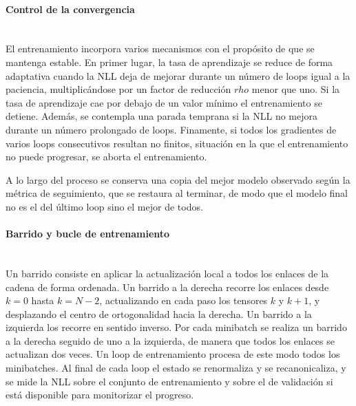 \documentclass[12pt]{extarticle}
\numberwithin{equation}{section}
\begin{document}
\begin{refsection}
\paragraph{Control de la convergencia}
\mbox{}\\

El entrenamiento incorpora varios mecanismos con el propósito de que se mantenga estable. En primer lugar, la tasa de aprendizaje se reduce de forma adaptativa cuando la NLL deja de mejorar durante un número de loops igual a la paciencia, multiplicándose por un factor de reducción $rho$ menor que uno. Si la tasa de aprendizaje cae por debajo de un valor mínimo el entrenamiento se detiene. Además, se contempla una parada temprana si la NLL no mejora durante un número prolongado de loops. Finamente, si todos los gradientes de varios loops consecutivos resultan no finitos, situación en la que el entrenamiento no puede progresar, se aborta el entrenamiento. 

A lo largo del proceso se conserva una copia del mejor modelo observado según la métrica de seguimiento, que se restaura al terminar, de modo que el modelo final no es el del último loop sino el mejor de todos.

\paragraph{Barrido y bucle de entrenamiento}
\mbox{}\\

Un barrido consiste en aplicar la actualización local a todos los enlaces de la cadena de forma ordenada. Un barrido a la derecha recorre los enlaces desde $k=0$ hasta $k=N-2$, actualizando en cada paso los tensores $k$ y $k+1$, y desplazando el centro de ortogonalidad hacia la derecha. Un barrido a la izquierda los recorre en sentido inverso. Por cada minibatch se realiza un barrido a la derecha seguido de uno a la izquierda, de manera que todos los enlaces se actualizan dos veces. Un loop de entrenamiento procesa de este modo todos los minibatches. Al final de cada loop el estado se renormaliza y se recanonicaliza, y se mide la NLL sobre el conjunto de entrenamiento y sobre el de validación si está disponible para monitorizar el progreso.


\end{refsection}
\end{document}
